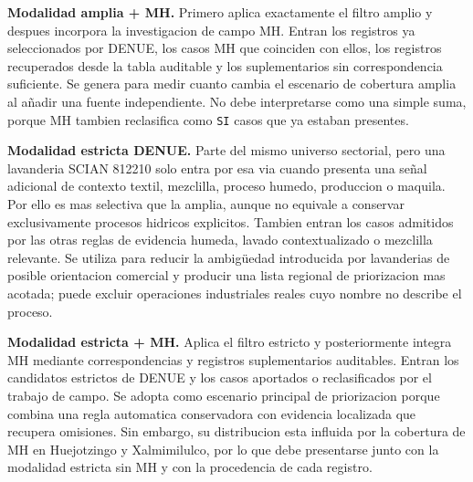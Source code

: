 \documentclass[11pt,letterpaper]{article}
\begin{document}
\textbf{Modalidad amplia + MH.} Primero aplica exactamente el filtro amplio y despues incorpora la investigacion de campo MH. Entran los registros ya seleccionados por DENUE, los casos MH que coinciden con ellos, los registros recuperados desde la tabla auditable y los suplementarios sin correspondencia suficiente. Se genera para medir cuanto cambia el escenario de cobertura amplia al añadir una fuente independiente. No debe interpretarse como una simple suma, porque MH tambien reclasifica como \texttt{SI} casos que ya estaban presentes.

\textbf{Modalidad estricta DENUE.} Parte del mismo universo sectorial, pero una lavanderia SCIAN 812210 solo entra por esa via cuando presenta una señal adicional de contexto textil, mezclilla, proceso humedo, produccion o maquila. Por ello es mas selectiva que la amplia, aunque no equivale a conservar exclusivamente procesos hidricos explicitos. Tambien entran los casos admitidos por las otras reglas de evidencia humeda, lavado contextualizado o mezclilla relevante. Se utiliza para reducir la ambigüedad introducida por lavanderias de posible orientacion comercial y producir una lista regional de priorizacion mas acotada; puede excluir operaciones industriales reales cuyo nombre no describe el proceso.

\textbf{Modalidad estricta + MH.} Aplica el filtro estricto y posteriormente integra MH mediante correspondencias y registros suplementarios auditables. Entran los candidatos estrictos de DENUE y los casos aportados o reclasificados por el trabajo de campo. Se adopta como escenario principal de priorizacion porque combina una regla automatica conservadora con evidencia localizada que recupera omisiones. Sin embargo, su distribucion esta influida por la cobertura de MH en Huejotzingo y Xalmimilulco, por lo que debe presentarse junto con la modalidad estricta sin MH y con la procedencia de cada registro.
\end{document}
